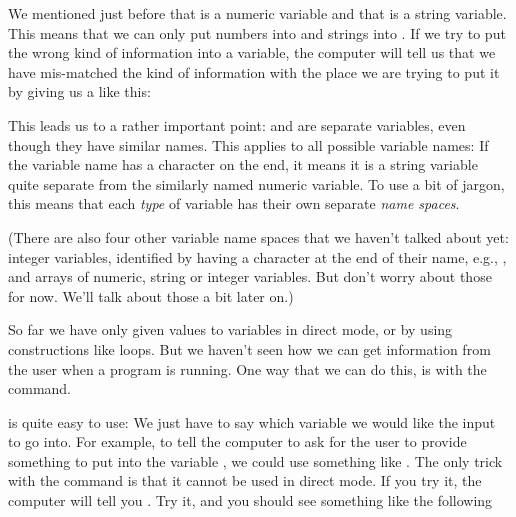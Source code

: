 \needspace{4cm} %
We mentioned just before that  is a numeric
variable and that  is a string variable. This
means that we can only put numbers into  and
strings into .  If we try to put the wrong kind
of information into a variable, the computer will tell us that we have
mis-matched the kind of information with the place we are trying to
put it by giving us a  like
this:


This leads us to a rather important point:  and
 are separate variables, even though they have
similar names.  This applies to all possible variable names: If the
variable name has a \screentextwide{\$} character on the end, it
means it is a string variable quite separate from the similarly named
numeric variable.  To use a bit of jargon, this means that each {\em type}
of variable has their own separate {\em name
  spaces}.

(There are also four other variable name
spaces that we haven't talked about yet: integer variables, identified
by having a \screentextwide{\%} character at the end of their name,
e.g., , and arrays of numeric, string or integer
variables. But don't worry about those for now.
We'll talk about those a bit later on.)

So far we have only given values to variables in direct mode, or
by using constructions like  loops.  But we
haven't seen how we can get information from the user when a program
is running.  One way that we can do this, is with the
command.

\needspace{4cm} %
 is quite easy to use: We just have to say which
variable we would like the input to go into.  For example, to tell the
computer to ask for the user to provide something to put into the
variable , we could use something like
.  The only trick with the 
command is that it cannot be used in direct mode.
If you try it, the computer will tell you .
Try it, and you should see something like the following


